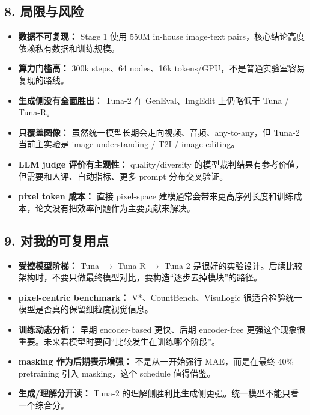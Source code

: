 \subsection{8. 局限与风险}

\begin{itemize}[leftmargin=1.5em]
  \item \textbf{数据不可复现：} Stage 1 使用 550M in-house image-text pairs，核心结论高度依赖私有数据和训练规模。
  \item \textbf{算力门槛高：} 300k steps、64 nodes、16k tokens/GPU，不是普通实验室容易复现的路线。
  \item \textbf{生成侧没有全面胜出：} Tuna-2 在 GenEval、ImgEdit 上仍略低于 Tuna / Tuna-R。
  \item \textbf{只覆盖图像：} 虽然统一模型长期会走向视频、音频、any-to-any，但 Tuna-2 当前主实验是 image understanding / T2I / image editing。
  \item \textbf{LLM judge 评价有主观性：} quality/diversity 的模型裁判结果有参考价值，但需要和人评、自动指标、更多 prompt 分布交叉验证。
  \item \textbf{pixel token 成本：} 直接 pixel-space 建模通常会带来更高序列长度和训练成本，论文没有把效率问题作为主要贡献来解决。
\end{itemize}

\subsection{9. 对我的可复用点}

\begin{itemize}[leftmargin=1.5em]
  \item \textbf{受控模型阶梯：} Tuna \(\rightarrow\) Tuna-R \(\rightarrow\) Tuna-2 是很好的实验设计。后续比较架构时，不要只做最终模型对比，要构造“逐步去掉模块”的路径。
  \item \textbf{pixel-centric benchmark：} V*、CountBench、VisuLogic 很适合检验统一模型是否真的保留细粒度视觉信息。
  \item \textbf{训练动态分析：} 早期 encoder-based 更快、后期 encoder-free 更强这个现象很重要。未来看模型时要问“比较发生在训练哪个阶段”。
  \item \textbf{masking 作为后期表示增强：} 不是从一开始强行 MAE，而是在最终 40\% pretraining 引入 masking，这个 schedule 值得借鉴。
  \item \textbf{生成/理解分开读：} Tuna-2 的理解侧胜利比生成侧更强。统一模型不能只看一个综合分。
\end{itemize}

